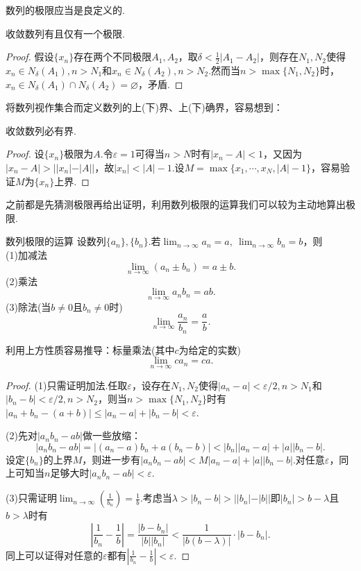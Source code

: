 数列的极限应当是良定义的.

\begin{proposition}{}
	收敛数列有且仅有一个极限.
\end{proposition}
\begin{proof}
	假设$\{ x_n \}$存在两个不同极限$A_1,A_2$，取$\delta < \frac{1}{2}|A_1-A_2|$，则存在$N_1,N_2$使得$x_n \in N_{\delta}(A_1),n > N_1$和$x_n \in N_{\delta}(A_2),n > N_2$.然而当$n>\max \{ N_1,N_2 \}$时，$x_n \in N_{\delta}(A_1) \cap N_{\delta}(A_2) = \varnothing$，矛盾.
\end{proof}

将数列视作集合而定义数列的上(下)界、上(下)确界，容易想到：

\begin{proposition}{}
	收敛数列必有界.
\end{proposition}
\begin{proof}
	设$\{ x_n \}$极限为$A$.令$\varepsilon = 1$可得当$n>N$时有$|x_n-A|<1$，又因为$|x_n-A|>||x_n|-|A||$，故$|x_n|<|A|-1$.设$M=\max \{ x_1, \cdots ,x_N,|A|-1 \}$，容易验证$M$为$\{ x_n \}$上界.
\end{proof}

之前都是先猜测极限再给出证明，利用数列极限的运算我们可以较为主动地算出极限.

\begin{theorem}{数列极限的运算}
	设数列$\{ a_n \},\{ b_n \}$.若$\lim_{n \to \infty} a_n=a,~\lim_{n \to \infty} b_n=b$，则 \\
	(1)加减法$$\lim_{n \to \infty}{(a_n \pm b_n)} = a \pm b.$$
	(2)乘法$$\lim_{n \to \infty}{a_nb_n} = ab.$$
	(3)除法(当$b \neq 0$且$b_n \neq 0$时)$$\lim_{n \to \infty}{\frac{a_n}{b_n}} = \frac{a}{b}.$$
\end{theorem}
\begin{remark}
	利用上方性质容易推导：标量乘法(其中$c$为给定的实数)$$\lim_{n \to \infty}{ca_n}=ca.$$
	
\end{remark}
\begin{proof}
	(1)只需证明加法.任取$\varepsilon$，设存在$N_1,N_2$使得$|a_n-a|<\varepsilon /2,n>N_1$和$|b_n-b|<\varepsilon /2,n>N_2$，则当$n>\max \{ N_1,N_2 \}$时有$|a_n+b_n-(a+b)| \leq |a_n-a|+|b_n-b| < \varepsilon$.
	
	(2)先对$|a_nb_n-ab|$做一些放缩：$$|a_nb_n-ab| = |(a_n-a)b_n + a(b_n-b)| < |b_n||a_n-a| + |a||b_n-b|.$$
	设定$\{ b_n \}$的上界$M$，则进一步有$|a_nb_n-ab|<M|a_n-a| + |a||b_n-b|$.对任意$\varepsilon$，同上可知当$n$足够大时$|a_nb_n-ab|<\varepsilon$.
	
	(3)只需证明$\lim_{n\to \infty}(\frac{1}{b_n})=\frac{1}{b}$.考虑当$\lambda > |b_n-b| > ||b_n|-|b||$即$|b_n|>b-\lambda$且$b>\lambda$时有$$\left| \frac{1}{b_n} - \frac{1}{b} \right| = \frac{|b-b_n|}{|b||b_n|} < \frac{1}{|b(b-\lambda)|} \cdot |b-b_n|.$$
	同上可以证得对任意的$\varepsilon$都有$|\frac{1}{b_n}-\frac{1}{b} |<\varepsilon$.
\end{proof}

